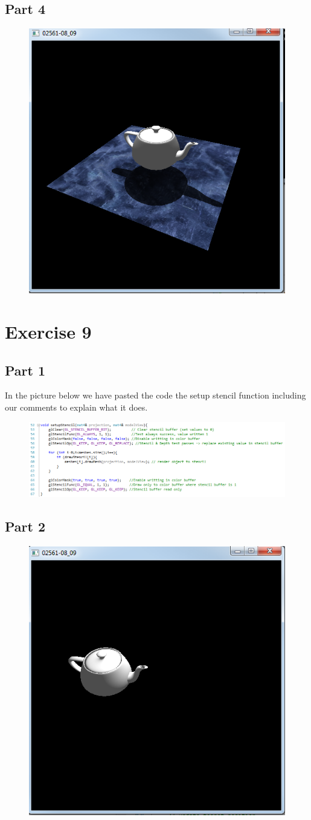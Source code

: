 \documentclass[11pt]{article}
\begin{document}
\subsection{Part 4}
\begin{figure}[H]
	\centering
	\includegraphics[width=0.5\linewidth]{images/e08p4}
	\label{fig:e08p4}
\end{figure}

\section{Exercise 9}
\subsection{Part 1}
In the picture below we have pasted the code the setup stencil function including our comments to explain what it does.

\begin{figure}[H]
	\centering
	\includegraphics[width=1.0\linewidth]{images/e09p1}
	\label{fig:e09p1}
\end{figure}

\subsection{Part 2}
\begin{figure}[H]
	\centering
	\includegraphics[width=0.5\linewidth]{images/e09p2}
	\label{fig:e09p2}
\end{figure}
\end{document}
